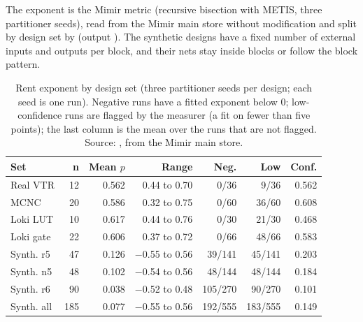  The exponent is the Mimir metric  (recursive bisection with METIS, three partitioner seeds), read from the Mimir main store without modification and split by design set by  (output ). The synthetic designs have a fixed number of external inputs and outputs per block, and their nets stay inside blocks or follow the block pattern.

\begin{table}[t]
\caption{Rent exponent  by design set (three partitioner seeds per design; each seed is one run). Negative runs have a fitted exponent below 0; low-confidence runs are flagged by the measurer (a fit on fewer than five points); the last column is the mean over the runs that are not flagged. Source: , from the Mimir main store.}
\label{tab:rent}
\centering
\footnotesize\setlength{\tabcolsep}{2pt}
\begin{tabular}{@{}lrrrrrr@{}}
\toprule
Set & n & Mean $p$ & Range & Neg. & Low & Conf. \\
\midrule
Real VTR & 12 & 0.562 & 0.44 to 0.70 & 0/36 & 9/36 & 0.562 \\
MCNC & 20 & 0.586 & 0.32 to 0.75 & 0/60 & 36/60 & 0.608 \\
Loki LUT & 10 & 0.617 & 0.44 to 0.76 & 0/30 & 21/30 & 0.468 \\
Loki gate & 22 & 0.606 & 0.37 to 0.72 & 0/66 & 48/66 & 0.583 \\
\midrule
Synth. r5 & 47 & 0.126 & $-$0.55 to 0.56 & 39/141 & 45/141 & 0.203 \\
Synth. n5 & 48 & 0.102 & $-$0.54 to 0.56 & 48/144 & 48/144 & 0.184 \\
Synth. r6 & 90 & 0.038 & $-$0.52 to 0.48 & 105/270 & 90/270 & 0.101 \\
\midrule
Synth. all & 185 & 0.077 & $-$0.55 to 0.56 & 192/555 & 183/555 & 0.149 \\
\bottomrule
\end{tabular}
\end{table}

